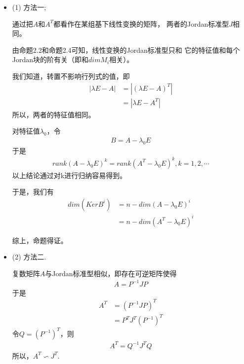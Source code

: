 \documentclass{article}
\begin{document}
\begin{itemize}
  \item (1) 方法一;

        通过把$A$和$A^T$都看作在某组基下线性变换的矩阵，
        两者的Jordan标准型$J$相同。

        由命题2.2和命题2.4可知，线性变换的Jordan标准型只和
        它的特征值和每个Jordan块的阶有关（即和$dim M_i$相关）。

        我们知道，转置不影响行列式的值，即
        \begin{align*}
          |\lambda E - A|
           & = |(\lambda E - A)^T| \\
           & = |\lambda E - A^T|
        \end{align*}
        所以，两者的特征值相同。

        对特征值$\lambda_0$，令
        \begin{align*}
          B = A - \lambda_0 E
        \end{align*}
        于是
        \begin{align*}
          rank (A - \lambda_0 E)^k = rank (A^T - \lambda_0 E)^k,
          k = 1, 2, \cdots
        \end{align*}
        以上结论通过对k进行归纳容易得到。

        于是，我们有
        \begin{align*}
          dim (Ker B^i)
           & = n - dim (A - \lambda_0 E)^i   \\
           & = n - dim (A^T - \lambda_0 E)^i
        \end{align*}

        综上，命题得证。

  \item (2) 方法二.

        复数矩阵$A$与Jordan标准型相似，即存在可逆矩阵使得
        \begin{align*}
          A = P^{-1} J P
        \end{align*}
        于是
        \begin{align*}
          A^T & = (P^{-1} J P)^T     \\
              & = P^T J^T (P^{-1})^T
        \end{align*}
        令$Q = (P^{-1})^T$，则
        \begin{align*}
          A^T = Q^{-1} J^T Q
        \end{align*}
        所以，$A^T \backsim  J^T$.


\end{itemize}
\end{document}
